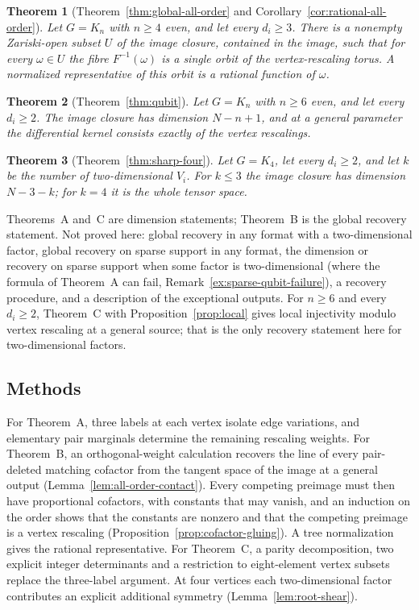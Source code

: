 \documentclass[11pt]{article}
\newtheorem{introthm}{Theorem}
\theoremstyle{remark}\newtheorem{remark}[theorem]{Remark}
\begin{document}
\begin{introthm}[Theorem~\ref{thm:global-all-order} and Corollary~\ref{cor:rational-all-order}]
Let $G=K_n$ with $n\geq4$ even, and let every $d_i\geq3$. There is a nonempty Zariski-open subset $U$ of the image closure, contained in the image, such that for every $\omega\in U$ the fibre $F^{-1}(\omega)$ is a single orbit of the vertex-rescaling torus. A normalized representative of this orbit is a rational function of $\omega$.
\end{introthm}

\begin{introthm}[Theorem~\ref{thm:qubit}]
Let $G=K_n$ with $n\geq6$ even, and let every $d_i\geq2$. The image closure has dimension $N-n+1$, and at a general parameter the differential kernel consists exactly of the vertex rescalings.
\end{introthm}

\begin{introthm}[Theorem~\ref{thm:sharp-four}]
Let $G=K_4$, let every $d_i\geq2$, and let $k$ be the number of two-dimensional $V_i$. For $k\leq3$ the image closure has dimension $N-3-k$; for $k=4$ it is the whole tensor space.
\end{introthm}

Theorems~A and~C are dimension statements; Theorem~B is the global recovery statement. Not proved here: global recovery in any format with a two-dimensional factor, global recovery on sparse support in any format, the dimension or recovery on sparse support when some factor is two-dimensional (where the formula of Theorem~A can fail, Remark~\ref{ex:sparse-qubit-failure}), a recovery procedure, and a description of the exceptional outputs. For $n\geq6$ and every $d_i\geq2$, Theorem~C with Proposition~\ref{prop:local} gives local injectivity modulo vertex rescaling at a general source; that is the only recovery statement here for two-dimensional factors.

\subsection*{Methods}
For Theorem~A, three labels at each vertex isolate edge variations, and elementary pair marginals determine the remaining rescaling weights. For Theorem~B, an orthogonal-weight calculation recovers the line of every pair-deleted matching cofactor from the tangent space of the image at a general output (Lemma~\ref{lem:all-order-contact}). Every competing preimage must then have proportional cofactors, with constants that may vanish, and an induction on the order shows that the constants are nonzero and that the competing preimage is a vertex rescaling (Proposition~\ref{prop:cofactor-gluing}). A tree normalization gives the rational representative. For Theorem~C, a parity decomposition, two explicit integer determinants and a restriction to eight-element vertex subsets replace the three-label argument. At four vertices each two-dimensional factor contributes an explicit additional symmetry (Lemma~\ref{lem:root-shear}).
\end{document}
